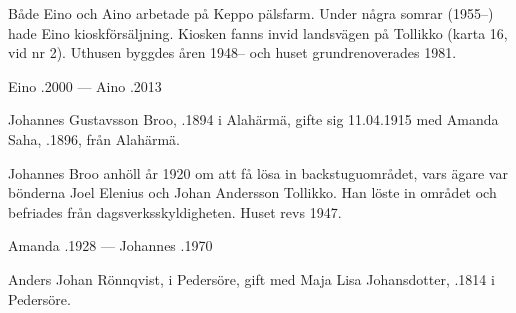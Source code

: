Både Eino och Aino arbetade på Keppo pälsfarm. Under några somrar (1955--) hade Eino kioskförsäljning. Kiosken fanns invid landsvägen på Tollikko (karta 16, vid nr 2). Uthusen byggdes åren 1948-- och huset grundrenoverades 1981.

Eino .2000  ---  Aino .2013




Johannes Gustavsson Broo, .1894 i Alahärmä, gifte sig 11.04.1915 med Amanda Saha, .1896, från Alahärmä.
\begin{jhchildren}
  \item {}
  \item {}
  \item {}
  \item {}
\end{jhchildren}

Johannes Broo anhöll år 1920 om att få lösa in backstuguområdet, vars ägare var bönderna Joel Elenius och Johan Andersson Tollikko. Han löste in området och befriades från dagsverksskyldigheten. Huset revs 1947.

Amanda .1928  ---  Johannes .1970


Anders Johan Rönnqvist,  i Pedersöre, gift med Maja Lisa Johansdotter, .1814 i Pedersöre.
\begin{jhchildren}
  \item {}
  \item {}
  \item {}
  \item {}
  \item {}
  \item {}
  \item {}
  \item {}
\end{jhchildren}

